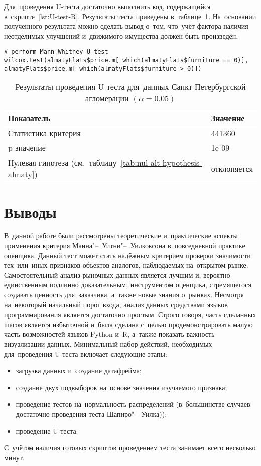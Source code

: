 \documentclass[]{scrartcl}
\begin{document}
Для~проведения U-теста достаточно выполнить код, содержащийся в~скрипте~\ref{lst:U-test-R}. Результаты теста приведены в~таблице~\ref{tab:u-test-r-result}. На~основании полученного результата можно сделать вывод о~том, что~учёт фактора наличия неотделимых улучшений и~движимого имущества должен быть произведён.
%
\begin{lstlisting}[float, caption = Проведение U-теста для данных города Алматы, firstnumber=1, label= lst:U-test-R]
# perform Mann-Whitney U-test
wilcox.test(almatyFlats$price.m[ which(almatyFlats$furniture == 0)],
almatyFlats$price.m[ which(almatyFlats$furniture > 0)]) 
\end{lstlisting}
%
\begin{table}[ht]
	\caption{Результаты проведения U-теста для~данных Санкт-Петербургской агломерации $({\textstyle \alpha=0.05})$}\label{tab:u-test-r-result}
	\centering
	\begin{tabular}{ll}
		\hline
		Показатель&Значение\\
		\hline
		Статистика критерия&441360\\
		\hline
		p-значение&1e-09\\
		\hline
		Нулевая гипотеза (см.~таблицу~\ref{tab:nul-alt-hypothesis-almaty})&отклоняется\\
		\hline
	\end{tabular}
\end{table}
%

\clearpage

\section{Выводы}
В~данной работе были рассмотрены теоретические и~практические аспекты применения критерия Манна"--~Уитни"--~Уилкоксона в~повседневной практике оценщика. Данный тест может стать надёжным критерием проверки значимости тех~или~иных признаков объектов-аналогов, наблюдаемых на~открытом рынке. Самостоятельный анализ рыночных данных является лучшим и, вероятно единственным подлинно доказательным, инструментом оценщика, стремящегося создавать ценность для~заказчика, а~также новые знания о~рынках. Несмотря на~некоторый начальный порог входа, анализ данных средствами языков программирования является достаточно простым. Строго говоря, часть сделанных шагов является избыточной и~была сделана с~целью продемонстрировать малую часть возможностей языков Python и~R, а~также показать важность визуализации данных. Минимальный набор действий, необходимых для~проведения U-теста включает следующие этапы:
\begin{itemize}
	\item загрузка данных и~создание датафрейма;
	\item создание двух подвыборок на~основе значения изучаемого признака;
	\item проведение тестов на~нормальность распределений (в~большинстве случаев достаточно проведения теста Шапиро"--~Уилка));
	\item проведение U-теста.
\end{itemize}
С~учётом наличия готовых скриптов проведением теста занимает всего несколько минут.
\end{document}
